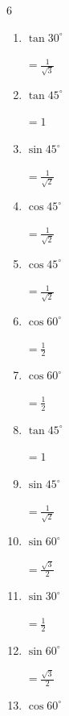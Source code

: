 \begin{multicols}{6}
\begin{enumerate}
        $\displaystyle =\frac{1}{\sqrt{2}}$

  \item $\displaystyle \tan{30^\circ}$

        $\displaystyle =\frac{1}{\sqrt{3}}$

  \item $\displaystyle \tan{45^\circ}$

        $\displaystyle =1$

  \item $\displaystyle \sin{45^\circ}$

        $\displaystyle =\frac{1}{\sqrt{2}}$

  \item $\displaystyle \cos{45^\circ}$

        $\displaystyle =\frac{1}{\sqrt{2}}$

  \item $\displaystyle \cos{45^\circ}$

        $\displaystyle =\frac{1}{\sqrt{2}}$

  \item $\displaystyle \cos{60^\circ}$

        $\displaystyle =\frac{1}{2}$

  \item $\displaystyle \cos{60^\circ}$

        $\displaystyle =\frac{1}{2}$

  \item $\displaystyle \tan{45^\circ}$

        $\displaystyle =1$

  \item $\displaystyle \sin{45^\circ}$

        $\displaystyle =\frac{1}{\sqrt{2}}$

  \item $\displaystyle \sin{60^\circ}$

        $\displaystyle =\frac{\sqrt{3}}{2}$

  \item $\displaystyle \sin{30^\circ}$

        $\displaystyle =\frac{1}{2}$

  \item $\displaystyle \sin{60^\circ}$

        $\displaystyle =\frac{\sqrt{3}}{2}$

\columnbreak %

  \item $\displaystyle \cos{60^\circ}$


\end{enumerate}
\end{multicols}
